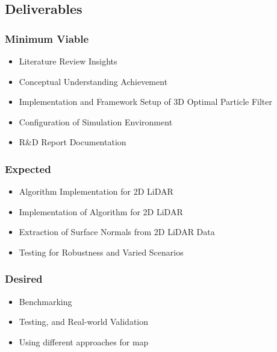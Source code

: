 \documentclass[rnd]{mas_proposal}
\begin{document}
\subsection{Deliverables}

\subsubsection*{Minimum Viable}
\begin{itemize}
    \item Literature Review Insights
    \item Conceptual Understanding Achievement 
    \item Implementation and Framework Setup of 3D Optimal Particle Filter
    \item Configuration of Simulation Environment
    \item R\&D Report Documentation
\end{itemize}

\subsubsection*{Expected}
\begin{itemize}
    \item Algorithm Implementation for 2D LiDAR
    \item Implementation of Algorithm for 2D LiDAR
    \item Extraction of Surface Normals from 2D LiDAR Data
    \item Testing for Robustness and Varied Scenarios
\end{itemize}

\subsubsection*{Desired}
\begin{itemize}
    \item Benchmarking
    \item Testing, and Real-world Validation 
    \item Using different approaches for map
\end{itemize}

\newpage
\nocite{*}

\end{document}
